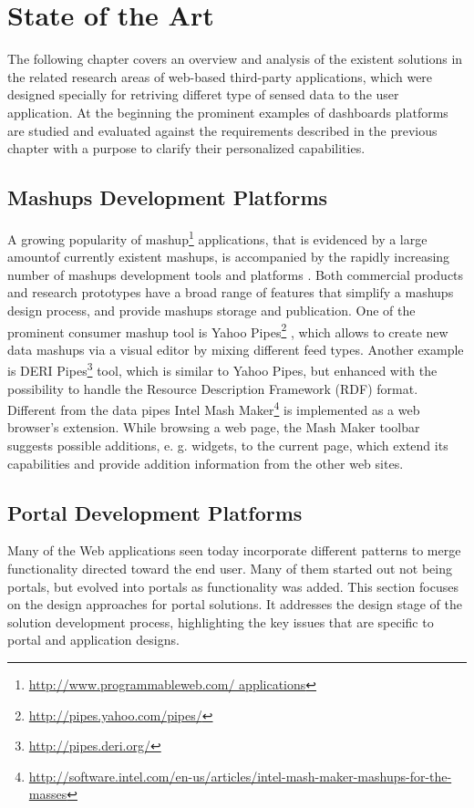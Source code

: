 \chapter{State of the Art}
The following chapter covers an overview and analysis of the existent solutions in
the related research areas of web-based third-party applications, which were designed specially for retriving differet type of sensed data to the user application. At the beginning the prominent examples of dashboards platforms are studied and evaluated against the requirements described in the previous chapter with a purpose to clarify their personalized capabilities.

\section{Mashups Development Platforms}
A growing popularity of mashup\footnote{\url{http://www.programmableweb.com/ applications}} applications, that is evidenced by a large amountof currently existent mashups, is accompanied by the rapidly increasing number of
mashups development tools and platforms \cite{taivalsaari2009mashware, koschmider2009elucidating, daniel2010toward, aghaee2012reusable}. Both commercial products and research prototypes have a broad range of features that
simplify a mashups design process, and provide mashups storage and publication.
One of the prominent consumer mashup tool is Yahoo Pipes\footnote{\url{http://pipes.yahoo.com/pipes/}} , which allows to create new data mashups via a visual editor by mixing different feed types. Another example is DERI Pipes\footnote{\url{http://pipes.deri.org/}} tool, which is similar to Yahoo Pipes, but enhanced with the possibility to handle the Resource Description
Framework (RDF) format. Different from the data pipes Intel Mash Maker\footnote{\url{http://software.intel.com/en-us/articles/intel-mash-maker-mashups-for-the-masses}} is implemented as a web browser’s extension. While browsing a web page, the Mash
Maker toolbar suggests possible additions, e. g. widgets, to the current page, which
extend its capabilities and provide addition information from the other web sites.

\section{Portal Development Platforms}
Many of the Web applications seen today incorporate different patterns to merge
functionality directed toward the end user. Many of them started out not being
portals, but evolved into portals as functionality was added.
This section focuses on the design approaches for portal solutions. 
It addresses the design stage of the solution development process, highlighting the key issues that are specific to portal and
application designs\cite{nath2006challenge,pautasso2008restful,seong2006usability}.

